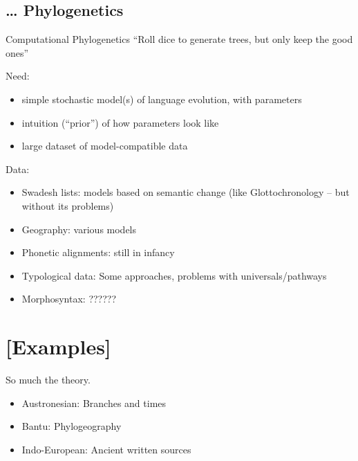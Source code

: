 \documentclass[9pt]{beamer}
\begin{document}
\subsection{… Phylogenetics}
\begin{frame}{Computational Phylogenetics}
  “Roll dice to generate trees, but only keep the good ones”

  \pause
  Need:
  \begin{itemize}
  \item simple stochastic model(s) of language evolution, with parameters
  \item intuition (“prior”) of how parameters look like
  \item large dataset of model-compatible data
  \end{itemize}

  \pause
  Data:
  \begin{itemize}
  \item Swadesh lists: models based on semantic change (like Glottochronology – but without its problems)
  \item Geography: various models
  \item Phonetic alignments: still in infancy
  \item Typological data: Some approaches, problems with universals/pathways
  \item Morphosyntax: ??????
  \end{itemize}
\end{frame}
\section{[Examples]}
\begin{frame}{So much the theory.}
  \begin{itemize}
  \item Austronesian: Branches and times
  \item Bantu: Phylogeography
  \item Indo-European: Ancient written sources
  \end{itemize}
\end{frame}
\end{document}
